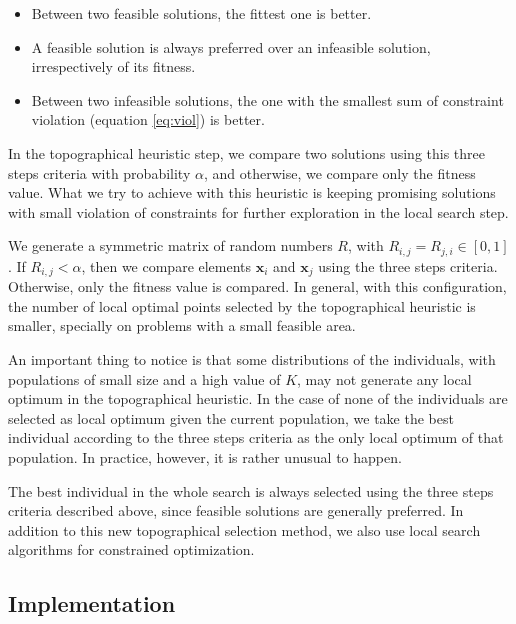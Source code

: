 \begin{itemize}

\item Between two feasible solutions, the fittest one is better.

\item A feasible solution is always preferred over an infeasible solution, irrespectively of its fitness.

\item Between two infeasible solutions, the one with the smallest sum of constraint violation (equation \ref{eq:viol}) is better.

\end{itemize}


In the topographical heuristic step, we compare two solutions using this three steps criteria with probability $\alpha$, and otherwise, we compare only the fitness value. What we try to achieve with this heuristic is keeping promising solutions with small violation of constraints for further exploration in the local search step.

We generate a symmetric matrix of random numbers $R$, with $R_{i, j} = R_{j, i} \in [0, 1]$. If $R_{i, j} < \alpha$, then we compare elements $\bm{x}_i$ and $\bm{x}_j$ using the three steps criteria. Otherwise, only the fitness value is compared. In general, with this configuration, the number of local optimal points selected by the topographical heuristic is smaller, specially on problems with a small feasible area. 

An important thing to notice is that some distributions of the individuals, with populations of small size and a high value of $K$, may not generate any local optimum in the topographical heuristic. In the case of none of the individuals are selected as local optimum given the current population, we take the best individual according to the three steps criteria as the only local optimum of that population. In practice, however, it is rather unusual to happen.

The best individual in the whole search is always selected using the three steps criteria described above, since feasible solutions are generally preferred. In addition to this new topographical selection method, we also use local search algorithms for constrained optimization.


\subsection{Implementation}

